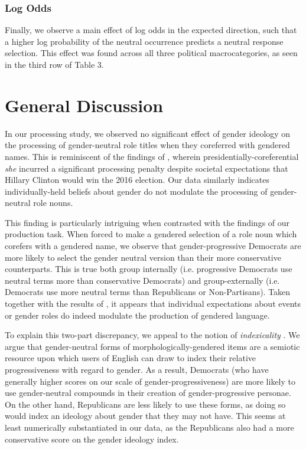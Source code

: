\documentclass[10pt,letterpaper]{article}
\begin{document}
	
	\subsubsection{Log Odds} Finally, we observe a main effect of log odds in the expected direction, such that a higher log probability of the neutral occurrence predicts a neutral response selection. This effect was found across all three political macrocategories, as seen in the third row of Table 3.

	
	\section{General Discussion}
	 In our processing study, we observed no significant effect of gender ideology on the processing of gender-neutral role titles when they coreferred with gendered names. This is reminiscent of the findings of \textcite{von2020implicit}, wherein presidentially-coreferential \textit{she} incurred a significant processing penalty despite societal expectations that Hillary Clinton would win the 2016 election. Our data similarly indicates individually-held beliefs about gender do not modulate the processing of gender-neutral role nouns.\par 
	This finding is particularly intriguing when contrasted with the findings of our production task. When forced to make a gendered selection of a role noun which corefers with a gendered name, we observe that gender-progressive Democrats are more likely to select the gender neutral version than their more conservative counterparts. This is true both group internally (i.e. progressive Democrats use neutral terms more than conservative Democrats) and group-externally (i.e. Democrats use more neutral terms than Republicans or Non-Partisans). Taken together with the results of \textcite{pozniak2021failures}, it appears that individual expectations about events or gender roles do indeed modulate the production of gendered language.\par 
	To explain this two-part discrepancy, we appeal to the notion of \textit{indexicality} \parencite{eckert2008variation}. We argue that gender-neutral forms of morphologically-gendered items are a semiotic resource upon which users of English can draw to index their relative progressiveness with regard to gender. As a result, Democrats (who have generally higher scores on our scale of gender-progressiveness) are more likely to use gender-neutral compounds in their creation of gender-progressive personae. On the other hand, Republicans are less likely to use these forms, as doing so would index an ideology about gender that they may not have. This seems at least numerically substantiated in our data, as the Republicans also had a more conservative score on the gender ideology index. \par 
\end{document}
